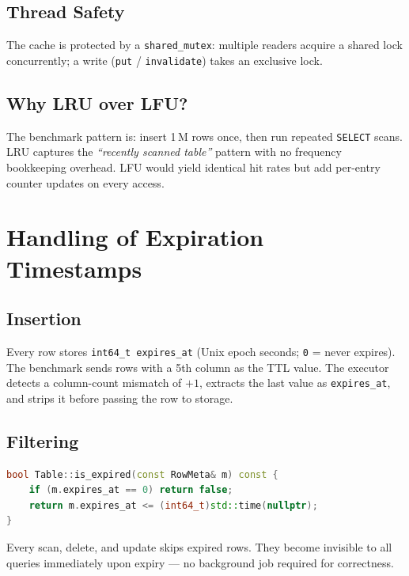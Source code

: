 \documentclass[12pt,a4paper]{article}
\begin{document}
\subsection{Thread Safety}

The cache is protected by a \texttt{shared\_mutex}: multiple readers acquire a shared
lock concurrently; a write (\texttt{put} / \texttt{invalidate}) takes an exclusive lock.

\subsection{Why LRU over LFU?}

The benchmark pattern is: insert 1\,M rows once, then run repeated \texttt{SELECT} scans.
LRU captures the \textit{``recently scanned table''} pattern with no frequency bookkeeping
overhead. LFU would yield identical hit rates but add per-entry counter updates on every
access.

\section{Handling of Expiration Timestamps}

\subsection{Insertion}

Every row stores \texttt{int64\_t expires\_at} (Unix epoch seconds; \texttt{0} = never
expires). The benchmark sends rows with a 5th column as the TTL value. The executor
detects a column-count mismatch of $+1$, extracts the last value as \texttt{expires\_at},
and strips it before passing the row to storage.

\subsection{Filtering}

\begin{lstlisting}[language=C++]
bool Table::is_expired(const RowMeta& m) const {
    if (m.expires_at == 0) return false;
    return m.expires_at <= (int64_t)std::time(nullptr);
}
\end{lstlisting}

Every scan, delete, and update skips expired rows. They become invisible to all queries
immediately upon expiry — no background job required for correctness.
\end{document}
